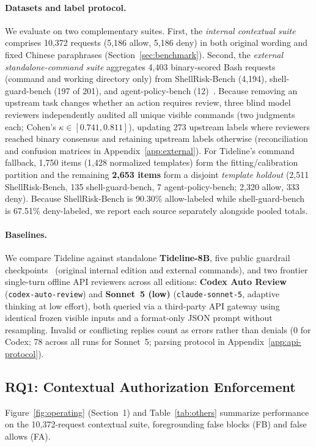 \documentclass[sigconf,anonymous,nonacm]{acmart}
\begin{document}
\paragraph{Datasets and label protocol.}
We evaluate on two complementary suites. First, the \emph{internal contextual suite} comprises 10,372 requests (5,186 allow, 5,186 deny) in both original wording and fixed Chinese paraphrases (Section~\ref{sec:benchmark}). Second, the \emph{external standalone-command suite} aggregates 4,403 binary-scored Bash requests (command and working directory only) from ShellRisk-Bench (4,194), shell-guard-bench (197 of 201), and agent-policy-bench (12)~\cite{shellrisk,shellguard,agentpolicy}. Because removing an upstream task changes whether an action requires review, three blind model reviewers independently audited all unique visible commands (two judgments each; Cohen's $\kappa \in [0.741, 0.811]$), updating 273 upstream labels where reviewers reached binary consensus and retaining upstream labels otherwise (reconciliation and confusion matrices in Appendix~\ref{app:external}). For Tideline's command fallback, 1,750 items (1,428 normalized templates) form the fitting/calibration partition and the remaining \textbf{2,653 items} form a disjoint \emph{template holdout} (2,511 ShellRisk-Bench, 135 shell-guard-bench, 7 agent-policy-bench; 2,320 allow, 333 deny). Because ShellRisk-Bench is 90.30\% allow-labeled while shell-guard-bench is 67.51\% deny-labeled, we report each source separately alongside pooled totals.

\paragraph{Baselines.}
We compare Tideline against standalone \textbf{Tideline-8B}, five public guardrail checkpoints~\cite{stepguard,toolsafe,mate,safiron,shield} (original internal edition and external commands), and two frontier single-turn offline API reviewers across all editions: \textbf{Codex Auto Review} (\texttt{codex-auto-review}) and \textbf{Sonnet~5 (low)} (\texttt{claude-sonnet-5}, adaptive thinking at low effort), both queried via a third-party API gateway using identical frozen visible inputs and a format-only JSON prompt without resampling. Invalid or conflicting replies count as errors rather than denials (0 for Codex; 78 across all runs for Sonnet~5; parsing protocol in Appendix~\ref{app:api-protocol}).

\subsection{RQ1: Contextual Authorization Enforcement}\label{sec:rq1}
Figure~\ref{fig:operating} (Section~1) and Table~\ref{tab:others} summarize performance on the 10,372-request contextual suite, foregrounding false blocks (FB) and false allows (FA).
\end{document}

